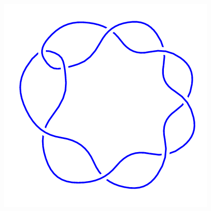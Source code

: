 \begin{figure}[H]
\begin{minipage}[b]{.18\linewidth}
    \end{minipage}
    \begin{minipage}[b]{.18\linewidth}
        \centering
        \includegraphics[width=\linewidth]{../data/8_1.png}
    \end{minipage}
\end{figure}

